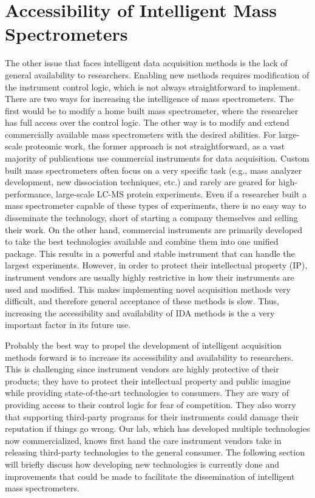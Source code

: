 \section{Accessibility of Intelligent Mass Spectrometers}
The other issue that faces intelligent data acquisition methods is the lack of general availability to researchers. Enabling new methods requires modification of the instrument control logic, which is not always straightforward to implement. There are two ways for increasing the intelligence of mass spectrometers. The first would be to modify a home built mass spectrometer, where the researcher has full access over the control logic. The other way is to modify and extend commercially available mass spectrometers with the desired abilities. For large-scale proteomic work, the former approach is not straightforward, as a vast majority of publications use commercial instruments for data acquisition. Custom built mass spectrometers often focus on a very specific task (e.g., mass analyzer development, new dissociation techniques, etc.) and rarely are geared for high-performance, large-scale LC-MS protein experiments. Even if a researcher built a mass spectrometer capable of these types of experiments, there is no easy way to disseminate the technology, short of starting a company themselves and selling their work. On the other hand, commercial instruments are primarily developed to take the best technologies available and combine them into one unified package. This results in a powerful and stable instrument that can handle the largest experiments. However, in order to protect their intellectual property (IP), instrument vendors are usually highly restrictive in how their instruments are used and modified. This makes implementing novel acquisition methods very difficult, and therefore general acceptance of these methods is slow. Thus, increasing the accessibility and availability of IDA methods is the a very important factor in its future use.

Probably the best way to propel the development of intelligent acquisition methods forward is to increase its accessibility and availability to researchers. This is challenging since instrument vendors are highly protective of their products; they have to protect their intellectual property and public imagine while providing state-of-the-art technologies to consumers. They are wary of providing access to their control logic for fear of competition. They also worry that supporting third-party programs for their instruments could damage their reputation if things go wrong. Our lab, which has developed multiple technologies now commercialized, knows first hand the care instrument vendors take in releasing third-party technologies to the general consumer. The following section will briefly discuss how developing new technologies is currently done and improvements that could be made to facilitate the dissemination of intelligent mass spectrometers.  

